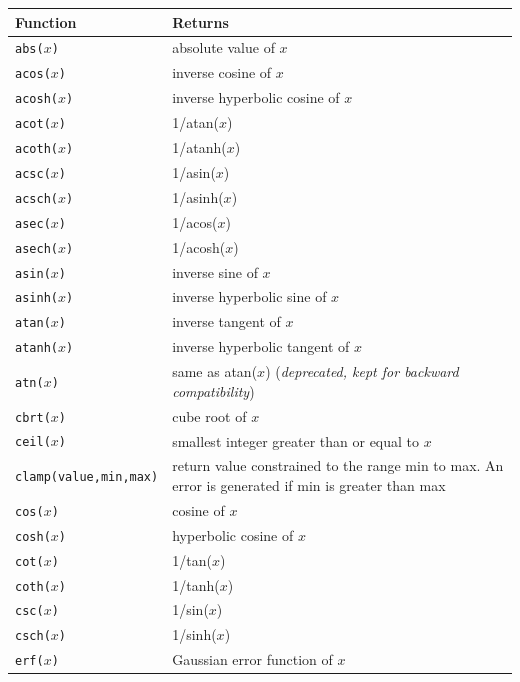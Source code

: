 \begin{supertabular}{lp{10cm}}
\hline Function & Returns \\
 \hline
  {\tt abs($x$)}  & absolute value of $x$ \\
  {\tt acos($x$)}  & inverse cosine of $x$ \\
  {\tt acosh($x$)}  & inverse hyperbolic cosine of $x$ \\
  {\tt acot($x$)}  & 1/atan($x$) \\
  {\tt acoth($x$)}  & 1/atanh($x$) \\
  {\tt acsc($x$)}  & 1/asin($x$) \\
  {\tt acsch($x$)}  & 1/asinh($x$) \\
  {\tt asec($x$)}  & 1/acos($x$) \\
  {\tt asech($x$)}  & 1/acosh($x$) \\
  {\tt asin($x$)}  & inverse sine of $x$ \\
  {\tt asinh($x$)}  & inverse hyperbolic sine of $x$ \\
  {\tt atan($x$)}  & inverse tangent of $x$ \\
  {\tt atanh($x$)}  & inverse hyperbolic tangent of $x$ \\
  {\tt atn($x$)}  & same as atan($x$) ({\it deprecated, kept for backward compatibility}) \\
  {\tt cbrt($x$)}  & cube root of $x$ \\
  {\tt ceil($x$)}  & smallest integer greater than or equal to $x$ \\
  {\tt clamp(value,min,max)}  & return value constrained to the range min to max. An error is   generated if min is greater than max \\
  {\tt cos($x$)}  & cosine of $x$ \\
  {\tt cosh($x$)}  & hyperbolic cosine of $x$ \\
  {\tt cot($x$)}  & 1/tan($x$) \\
  {\tt coth($x$)}  & 1/tanh($x$) \\
  {\tt csc($x$)}  & 1/sin($x$) \\
  {\tt csch($x$)}  & 1/sinh($x$) \\
  {\tt erf($x$)}  & Gaussian error function of $x$ \\

\end{supertabular}
